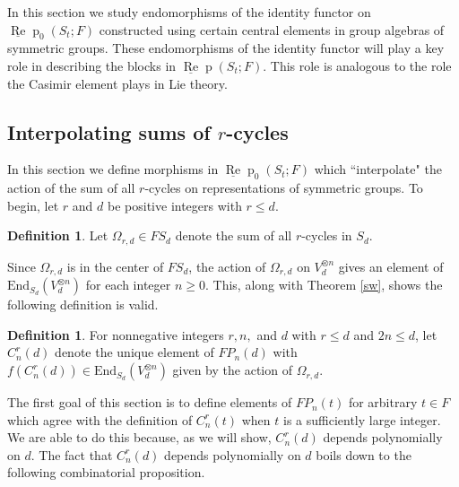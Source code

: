 \documentclass{amsart}
\theoremstyle{definition}
\newtheorem{definition}[theorem]{Definition}
\newcommand{\End}{\text{End}}
\def\uRep{\underline{\operatorname{Re}}\!\operatorname{p}}
\renewcommand{\1}{_{(1)}}
\renewcommand{\2}{_{(2)}}
\newcommand{\3}{_{(3)}}
\newcommand{\4}{_{(4)}}
\begin{document}
In this section we study endomorphisms of the identity functor on $\uRep_0(S_t; F)$ constructed using certain central elements in group algebras of symmetric groups.  These endomorphisms of the identity functor will play a key role in describing the blocks in $\uRep(S_t; F)$.  This role is analogous to the role the Casimir element plays in Lie theory.  





\subsection{Interpolating sums of $r$-cycles} In this section we define morphisms in $\uRep_0(S_t; F)$ which ``interpolate" the action of the sum of all $r$-cycles on representations of symmetric groups.  To begin, let $r$ and $d$ be positive integers with $r\leq d$. 
\begin{definition}\label{sums} Let $\Omega_{r, d}\in FS_d$ denote the sum of all $r$-cycles in $S_d$.\end{definition}  
Since $\Omega_{r, d}$ is in the center of $FS_d$, the action of $\Omega_{r, d}$ on $V_d^{\otimes n}$ gives an element of $\End_{S_d}(V_d^{\otimes n})$ for each integer $n\geq 0$.  
This, along with Theorem \ref{sw}, shows the following definition is valid.

\begin{definition}\label{Cint} For nonnegative integers $r, n,$ and $d$ with $r\leq d$ and $2n\leq d$, let $C_n^{r}( d)$ denote the unique element of $FP_n(d)$ with $f(C_n^r(d))\in\End_{S_d}(V_d^{\otimes n})$ given by the action of $\Omega_{r, d}$.
\end{definition}


The first goal of this section is to define elements of $FP_n(t)$ for arbitrary $t\in F$ which agree with the definition of $C_n^r(t)$ when $t$ is a sufficiently large integer.  We are able to do this because, as we will show, $C_n^r(d)$ depends polynomially on $d$.  The fact that $C_n^r(d)$ depends polynomially on $d$ boils down to the following combinatorial proposition.
\end{document}

